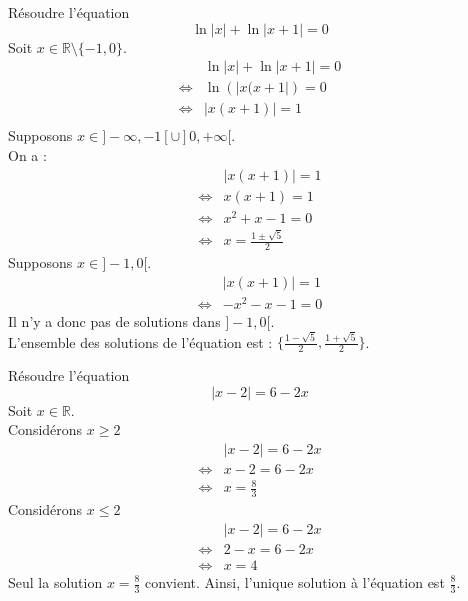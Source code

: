 \documentclass[11pt]{article}
\begin{document}
\begin{exercice}{}{}
    Résoudre l'équation
    \begin{equation*}
        \ln|x|+\ln|x+1|=0
    \end{equation*}
    \tcblower
    Soit $x\in\mathbb{R}\setminus\{-1,0\}$.
    \begin{align*}
        &\ln|x|+\ln|x+1|=0\\
        \iff&\ln\left(|x(x+1|\right)=0\\
        \iff&|x(x+1)|=1\\
    \end{align*}
    Supposons $x\in]-\infty,-1[\cup]0,+\infty[$.\\
    On a :
    \begin{align*}
        &|x(x+1)|=1\\
        \iff&x(x+1)=1\\
        \iff&x^2+x-1=0\\
        \iff&x=\frac{1\pm\sqrt{5}}{2}
    \end{align*}
    Supposons $x\in]-1,0[$.
    \begin{align*}
        &|x(x+1)|=1\\
        \iff&-x^2-x-1=0
    \end{align*}
    Il n'y a donc pas de solutions dans $]-1,0[$.\\
    L'ensemble des solutions de l'équation est : $\{\frac{1-\sqrt{5}}{2},\frac{1+\sqrt{5}}{2}\}$.
\end{exercice}

\begin{exercice}{}{}
    Résoudre l'équation
    \begin{equation*}
        |x-2|=6-2x
    \end{equation*}
    \tcblower
    Soit $x\in\mathbb{R}$.\\
    Considérons $x\geq2$
    \begin{align*}
        &|x-2|=6-2x\\
        \iff&x-2=6-2x\\
        \iff&x=\frac{8}{3}
    \end{align*}
    Considérons $x\leq2$
    \begin{align*}
        &|x-2|=6-2x\\
        \iff&2-x=6-2x\\
        \iff&x=4
    \end{align*}
    Seul la solution $x=\frac{8}{3}$ convient.
    Ainsi, l'unique solution à l'équation est $\frac{8}{3}$.
\end{exercice}
\end{document}
